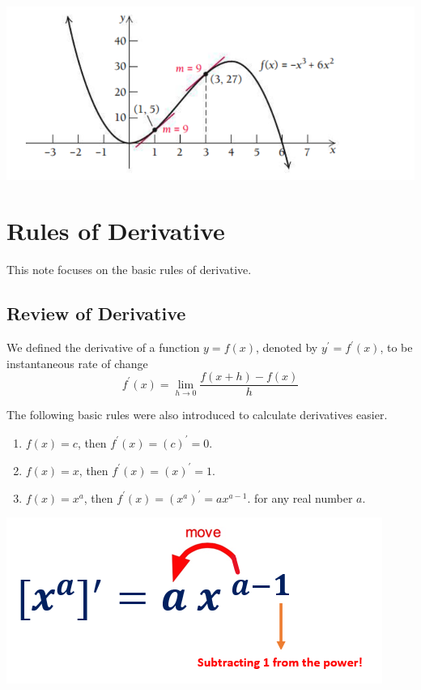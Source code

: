 \documentclass[
]{book}
\begin{document}
\begin{center}\includegraphics[width=0.75\linewidth]{img02/w02-example10-2} \end{center}

\hypertarget{rules-of-derivative}{%
\chapter{Rules of Derivative}\label{rules-of-derivative}}

This note focuses on the basic rules of derivative.

\hypertarget{review-of-derivative}{%
\section{Review of Derivative}\label{review-of-derivative}}

We defined the derivative of a function \(y = f(x)\), denoted by \(y^\prime = f^\prime(x)\), to be instantaneous rate of change
\[
f^\prime(x) = \lim_{h \to 0}\frac{f(x+h)-f(x)}{h}
\]

The following basic rules were also introduced to calculate derivatives easier.

\begin{enumerate}
\def\labelenumi{\arabic{enumi}.}
\item
  \(f(x) = c\), then \(f^\prime(x) = (c)^\prime = 0\).
\item
  \(f(x) = x\), then \(f^\prime(x) = (x)^\prime = 1\).
\item
  \(f(x) = x^a\), then \(f^\prime(x) = (x^a)^\prime = ax^{a-1}\). for any real number \(a\).
\end{enumerate}

\begin{center}\includegraphics[width=0.6\linewidth]{img03/w03note-PowerRule} \end{center}
\end{document}
